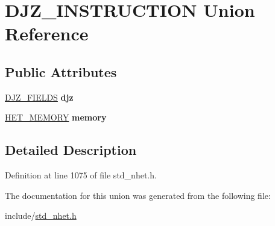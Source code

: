 \hypertarget{unionDJZ__INSTRUCTION}{}\section{D\+J\+Z\+\_\+\+I\+N\+S\+T\+R\+U\+C\+T\+I\+ON Union Reference}
\label{unionDJZ__INSTRUCTION}
\subsection*{Public Attributes}
\begin{DoxyCompactItemize}
\item 
\mbox{\label{unionDJZ__INSTRUCTION_a3d9b4123a9f4c83d6708573dae5380af}} 
\mbox{\hyperlink{structdjz__format}{D\+J\+Z\+\_\+\+F\+I\+E\+L\+DS}} {\bfseries djz}
\item 
\mbox{\label{unionDJZ__INSTRUCTION_ab83404e99fef007c1cd884baf8cd14d8}} 
\mbox{\hyperlink{structmemory__format}{H\+E\+T\+\_\+\+M\+E\+M\+O\+RY}} {\bfseries memory}
\end{DoxyCompactItemize}


\subsection{Detailed Description}


Definition at line 1075 of file std\+\_\+nhet.\+h.



The documentation for this union was generated from the following file\+:\begin{DoxyCompactItemize}
\item 
include/\mbox{\hyperlink{std__nhet_8h}{std\+\_\+nhet.\+h}}\end{DoxyCompactItemize}
